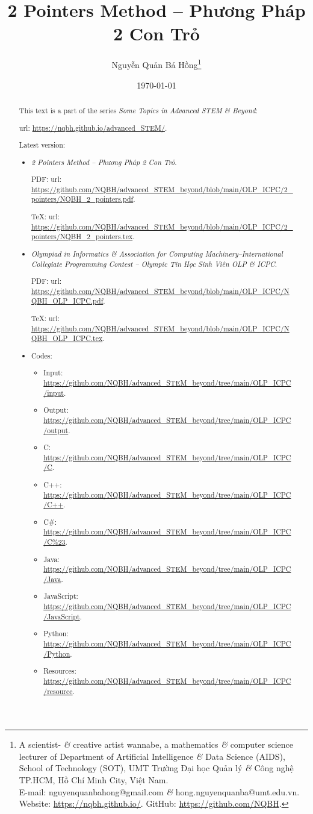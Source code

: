\documentclass{article}
\title{2 Pointers Method -- Phương Pháp 2 Con Trỏ}
\author{Nguyễn Quản Bá Hồng\footnote{A scientist- {\it\&} creative artist wannabe, a mathematics {\it\&} computer science lecturer of Department of Artificial Intelligence {\it\&} Data Science (AIDS), School of Technology (SOT), UMT Trường Đại học Quản lý {\it\&} Công nghệ TP.HCM, Hồ Chí Minh City, Việt Nam.\\E-mail: {\sf nguyenquanbahong@gmail.com} {\it\&} {\sf hong.nguyenquanba@umt.edu.vn}. Website: \url{https://nqbh.github.io/}. GitHub: \url{https://github.com/NQBH}.}}
\date{\today}
\begin{document}
\maketitle
\begin{abstract}
    This text is a part of the series {\it Some Topics in Advanced STEM \& Beyond}:

    {\sc url}: \url{https://nqbh.github.io/advanced_STEM/}.

    Latest version:
    \begin{itemize}
        \item {\it 2 Pointers Method -- Phương Pháp 2 Con Trỏ}.

        PDF: {\sc url}: \url{https://github.com/NQBH/advanced_STEM_beyond/blob/main/OLP_ICPC/2_pointers/NQBH_2_pointers.pdf}.

        \TeX: {\sc url}: \url{https://github.com/NQBH/advanced_STEM_beyond/blob/main/OLP_ICPC/2_pointers/NQBH_2_pointers.tex}.
        \item {\it Olympiad in Informatics \& Association for Computing Machinery--International Collegiate Programming Contest -- Olympic Tin Học Sinh Viên OLP \& ICPC}.

        PDF: {\sc url}: \url{https://github.com/NQBH/advanced_STEM_beyond/blob/main/OLP_ICPC/NQBH_OLP_ICPC.pdf}.

        \TeX: {\sc url}: \url{https://github.com/NQBH/advanced_STEM_beyond/blob/main/OLP_ICPC/NQBH_OLP_ICPC.tex}.
        \item Codes:
        \begin{itemize}
            \item Input: \url{https://github.com/NQBH/advanced_STEM_beyond/tree/main/OLP_ICPC/input}.
            \item Output: \url{https://github.com/NQBH/advanced_STEM_beyond/tree/main/OLP_ICPC/output}.
            \item C: \url{https://github.com/NQBH/advanced_STEM_beyond/tree/main/OLP_ICPC/C}.
            \item C++: \url{https://github.com/NQBH/advanced_STEM_beyond/tree/main/OLP_ICPC/C++}.
            \item C\#: \url{https://github.com/NQBH/advanced_STEM_beyond/tree/main/OLP_ICPC/C%23}.
            \item Java: \url{https://github.com/NQBH/advanced_STEM_beyond/tree/main/OLP_ICPC/Java}.
            \item JavaScript: \url{https://github.com/NQBH/advanced_STEM_beyond/tree/main/OLP_ICPC/JavaScript}.
            \item Python: \url{https://github.com/NQBH/advanced_STEM_beyond/tree/main/OLP_ICPC/Python}.
            \item Resources: \url{https://github.com/NQBH/advanced_STEM_beyond/tree/main/OLP_ICPC/resource}.
        \end{itemize}
    \end{itemize}
\end{abstract}
\tableofcontents
\end{document}
